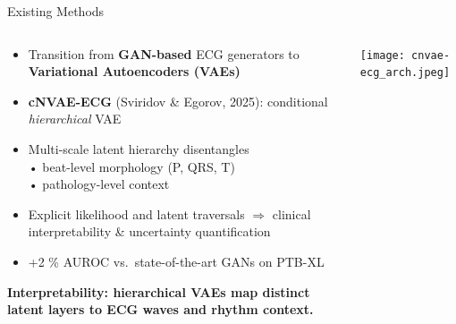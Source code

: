 \documentclass[aspectratio=169,11pt]{beamer}
\newcommand{\highlightbox}[2][tcairemred]{%
  \begin{center}
    \colorbox{#1!20}{\parbox{0.9\textwidth}{\centering\textcolor{#1}{\textbf{#2}}}}
  \end{center}}
\begin{document}
\begin{frame}{Existing Methods}
  \begin{columns}[T]
    \begin{column}{0.48\textwidth}
      \begin{itemize}
        \item Transition from \textbf{GAN-based} ECG generators to \textbf{Variational Autoencoders (VAEs)}
        \item \textbf{cNVAE-ECG} \tiny(Sviridov \& Egorov, 2025)\normalsize: conditional \emph{hierarchical} VAE
        \item Multi-scale latent hierarchy disentangles\\[-0.3em]
              \hspace{1em}• beat-level morphology (P, QRS, T)\\[-0.3em]
              \hspace{1em}• pathology-level context
        \item Explicit likelihood and latent traversals $\Rightarrow$ clinical interpretability \& uncertainty quantification
        \item +2 \% AUROC vs.\ state-of-the-art GANs on PTB-XL
      \end{itemize}

      \vspace{0.75em}
      \highlightbox[tcairemred]{Interpretability: hierarchical VAEs map distinct latent layers to ECG waves and rhythm context.}
    \end{column}

    \begin{column}{0.52\textwidth}
      \begin{center}
        \texttt{[image: cnvae-ecg\_arch.jpeg]}
      \end{center}
    \end{column}
  \end{columns}
\end{frame}
\end{document}
